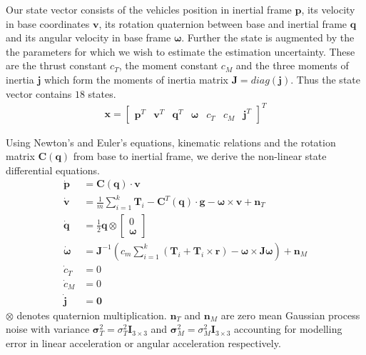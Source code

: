 \documentclass[10pt,a4paper]{article}
\begin{document}
Our state vector consists of the vehicles position in inertial frame $\mathbf{p}$, its velocity in base coordinates $\mathbf{v}$, its rotation quaternion between base and inertial frame $\mathbf{q}$ and its angular velocity in base frame $\boldsymbol{\omega}$. Further the state is augmented by the the parameters for which we wish to estimate the estimation uncertainty. These are the thrust constant $c_T$, the moment constant $c_M$ and the three moments of inertia $\mathbf{j}$ which form the moments of inertia matrix $\mathbf{J} = diag(\mathbf{j})$. Thus the state vector contains $18$ states.
\begin{align}
\mathbf{x} = \begin{bmatrix}
\mathbf{p}^T & \mathbf{v}^T & \mathbf{q}^T & \boldsymbol{\omega} & c_T & c_M & \mathbf{j}^T
\end{bmatrix} ^T
\end{align}

Using Newton's and Euler's equations, kinematic relations and the rotation matrix $\mathbf{C}(\mathbf{q})$ from base to inertial frame, we derive the non-linear state differential equations.
\begin{subequations}
\label{eq:model}
\begin{align}
\dot{\mathbf{p}} &= \mathbf{C}(\mathbf{q}) \cdot \mathbf{v} \\
\dot{\mathbf{v}} &= \frac{1}{m} \sum_{i=1}^k \mathbf{T}_i - \mathbf{C}^T(\mathbf{q}) \cdot \mathbf{g} - \boldsymbol{\omega} \times \mathbf{v} + \mathbf{n}_T \\
\dot{\mathbf{q}} &= \frac{1}{2} \mathbf{q} \otimes \begin{bmatrix}
0 \\ \boldsymbol{\omega}
\end{bmatrix} \\
\dot{\boldsymbol{\omega}} &= \mathbf{J}^{-1} \left( c_m \sum_{i=1}^k \left( \mathbf{T}_i + \mathbf{T}_i \times \mathbf{r} \right) - \boldsymbol{\omega} \times \mathbf{J} \boldsymbol{\omega} \right) + \mathbf{n}_M \\
\dot{c}_T &= 0 \\
\dot{c}_M &= 0 \\
\dot{\mathbf{j}} &= \mathbf{0}
\end{align}
\end{subequations}
$\otimes$ denotes quaternion multiplication. $\mathbf{n}_T$ and $\mathbf{n}_M$ are zero mean Gaussian process noise with variance $\boldsymbol{\sigma}_T^2 = \sigma_T^2 \mathbf{I}_{3\times3}$ and $\boldsymbol{\sigma}_M^2 = \sigma_M^2 \mathbf{I}_{3\times3}$ accounting for modelling error in linear acceleration or angular acceleration respectively.
\end{document}

